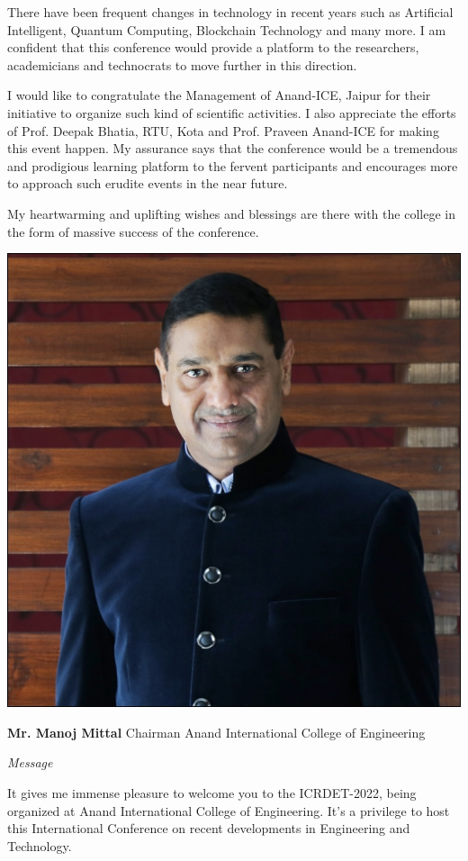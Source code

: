 \documentclass[twoside,11pt]{amsart}
\begin{document}
There have been frequent changes in technology in recent years such as Artificial Intelligent, Quantum Computing, Blockchain Technology and many more. I am confident that this conference would provide a platform to the researchers, academicians and technocrats to move further in this direction.

I would like to congratulate the Management of Anand-ICE, Jaipur for their initiative to organize such kind of scientific activities.  I also appreciate the efforts of Prof. Deepak Bhatia, RTU, Kota and Prof. Praveen Anand-ICE for making this event happen.
My assurance says that the conference would be a tremendous and prodigious learning platform to the fervent participants and encourages more to approach such erudite events in the near future.

My heartwarming and uplifting wishes and blessings are there with the college in the form of massive success of the conference.

\vskip 5mm
\newpage
\begin{flushright}
\includegraphics[height=8\baselineskip]{MM}
\end{flushright}
\vskip 1mm
\hfill \textbf{Mr. Manoj Mittal}
\vskip 1mm
\hfill Chairman
\vskip 1mm
\hfill Anand International College of Engineering
\vskip 10mm
\centerline {\huge{\emph{Message}}}
\vskip 5mm
It gives me immense pleasure to welcome you to the ICRDET-2022, being organized at Anand International College of Engineering. It's a privilege to host this International Conference on recent developments in Engineering and Technology.
\end{document}
